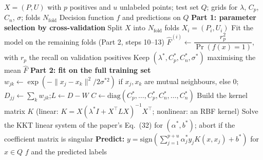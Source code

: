 \documentclass{article}
\begin{document}
\begin{algorithm}[!h]
\renewcommand{\algorithmicrequire}{\textbf{Input:}}
\renewcommand{\algorithmicensure}{\textbf{Output:}}
	\caption{GLLC (global and local learning from positive and unlabeled examples)}
	\begin{algorithmic}[1]
	    \REQUIRE
	    $X=(P,U)$ with $p$ positives and $u$ unlabeled points; test set $Q$;
	    grids for $\lambda$, $C_{p}$, $C_{n}$, $\sigma$; folds $N_{\mathrm{fold}}$
	    \ENSURE
	    Decision function $f$ and predictions on $Q$
	    \STATE \textbf{Part 1: parameter selection by cross-validation}
	    \STATE Split $X$ into $N_{\mathrm{fold}}$ folds $X_{i}=(P_{i},U_{i})$
	    \STATE Fit the model on the remaining folds (Part 2, steps 10--13)
	    \STATE $\hat{F}^{(i)}\leftarrow \dfrac{r_{p}^{2}}{\Pr(f(x)=1)}$,
	    with $r_{p}$ the recall on validation positives %
	    \ENDFOR
	    \ENDFOR
	    \STATE Keep $(\lambda^{\ast},C_{p}^{\ast},C_{n}^{\ast},\sigma^{\ast})$ maximising the mean
	    $\hat{F}$
	    \STATE \textbf{Part 2: fit on the full training set}
	    \STATE $w_{jk}\leftarrow \exp\!\left(-\|x_{j}-x_{k}\|^{2}/2\sigma^{\ast 2}\right)$ if
	    $x_{j},x_{k}$ are mutual neighbours, else $0$;\quad
	    $D_{jj}\leftarrow \sum_{k}w_{jk}$;\quad $L\leftarrow D-W$ %
	    \STATE $C\leftarrow \mathrm{diag}(C_{p}^{\ast},\dots,C_{p}^{\ast},C_{n}^{\ast},\dots,C_{n}^{\ast})$ %
	    \STATE Build the kernel matrix $K$ (linear: $K=X(\lambda^{\ast}I+X^{\top}LX)^{-1}X^{\top}$;
	    nonlinear: an RBF kernel)
	    \STATE Solve the KKT linear system of the paper's Eq.~(32) for $(\alpha^{\ast},b^{\ast})$;
	    abort if the coefficient matrix is singular %
	    \STATE \textbf{Predict:}
	    $y=\mathrm{sign}\!\left(\sum_{j=1}^{p+u}\alpha_{j}^{\ast}y_{j}K(x,x_{j})+b^{\ast}\right)$
	    for $x\in Q$
		\RETURN $f$ and the predicted labels
	\end{algorithmic}
\end{algorithm}
\end{document}
